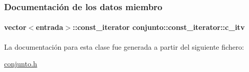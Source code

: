\subsubsection{Documentación de los datos miembro}
\hypertarget{classconjunto_1_1const__iterator_a6ffe0c493b12aa9f40dc1501f0c904fc}{
\paragraph[{c\-\_\-itv}]{\setlength{\rightskip}{0pt plus 5cm}vector$<${\bf entrada}$>$\-::{\bf const\-\_\-iterator} conjunto\-::const\-\_\-iterator\-::c\-\_\-itv\hspace{0.3cm}{\ttfamily [private]}}}\label{classconjunto_1_1const__iterator_a6ffe0c493b12aa9f40dc1501f0c904fc}


La documentación para esta clase fue generada a partir del siguiente fichero\-:\begin{DoxyCompactItemize}
\item 
\hyperlink{conjunto_8h}{conjunto.\-h}\end{DoxyCompactItemize}
